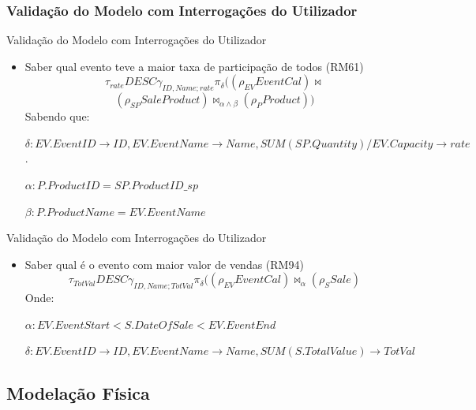 \documentclass[compress,svgnames,handout,13.7pt]{beamer}
\begin{document}
\subsubsection{Validação do Modelo com Interrogações do Utilizador}
\begin{frame}[fragile]{Validação do Modelo com Interrogações do Utilizador}
\usetikzlibrary{positioning}
\begin{itemize}
    \item{Saber qual evento teve a maior taxa de participação de todos (RM61)}
$$\tau_{rate} DESC \gamma_{ID, Name ; rate} \pi_{\delta}( (\rho_{EV}EventCal) \bowtie$$
    $$(\rho_{SP} SaleProduct)  \bowtie_{\alpha \wedge \beta}
(\rho_P Product)) $$
Sabendo que:

$\delta: EV.EventID\rightarrow ID,EV.EventName\rightarrow Name,SUM(SP.Quantity)/EV.Capacity\rightarrow rate$.

$\alpha: P.ProductID = SP.ProductID\_sp$

$\beta : P.ProductName = EV.EventName$
\end{itemize}
\end{frame}

\begin{frame}[fragile]{Validação do Modelo com Interrogações do Utilizador}
\begin{itemize}
\item{Saber qual é o evento com maior valor de vendas (RM94)}
$$\tau_{TotVal} DESC \gamma_{ID, Name; TotVal} \pi_{\delta}( (\rho_{EV} EventCal) \bowtie_{\alpha} (\rho_S Sale )$$
Onde:

$\alpha : EV.EventStart < S.DateOfSale < EV.EventEnd$

$\delta: EV.EventID\rightarrow ID, EV.EventName\rightarrow Name, SUM(S.TotalValue)\rightarrow TotVal$
\end{itemize}
\end{frame}
\subsection{Modelação Física}
\end{document}
